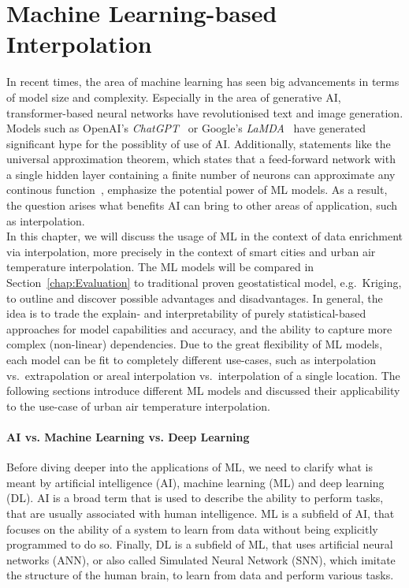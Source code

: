 \chapter{Machine Learning-based Interpolation}
\label{chap:Machine Learning based Interpolation}

In recent times, the area of machine learning has seen big advancements in terms of model size and complexity. Especially in the area of generative AI, transformer-based neural networks have revolutionised text and image generation. Models such as OpenAI's \textit{ChatGPT}~\cite{openai2023gpt4} or Google's \textit{LaMDA}~\cite{thoppilan2022lamda} have generated significant hype for the possiblity of use of AI\@. Additionally, statements like the universal approximation theorem, which states that a feed-forward network with a single hidden layer containing a finite number of neurons can approximate any continous function~\cite{hornik1989multilayer}, emphasize the potential power of ML models. As a result, the question arises what benefits AI can bring to other areas of application, such as interpolation.\\
In this chapter, we will discuss the usage of ML in the context of data enrichment via interpolation, more precisely in the context of smart cities and urban air temperature interpolation. The ML models will be compared in Section~\ref{chap:Evaluation} to traditional proven geostatistical model, e.g.\ Kriging, to outline and discover possible advantages and disadvantages. In general, the idea is to trade the explain- and interpretability of purely statistical-based approaches for model capabilities and accuracy, and the ability to capture more complex (non-linear) dependencies.
Due to the great flexibility of ML models, each model can be fit to completely different use-cases, such as interpolation vs.\ extrapolation or areal interpolation vs.\ interpolation of a single location. The following sections introduce different ML models and discussed their applicability to the use-case of urban air temperature interpolation.

\subsubsection{AI vs. Machine Learning vs. Deep Learning}

Before diving deeper into the applications of ML, we need to clarify what is meant by artificial intelligence (AI), machine learning (ML) and deep learning (DL). AI is a broad term that is used to describe the ability to perform tasks, that are usually associated with human intelligence. ML is a subfield of AI, that focuses on the ability of a system to learn from data without being explicitly programmed to do so. Finally, DL is a subfield of ML, that uses artificial neural networks (ANN), or also called Simulated Neural Network (SNN), which imitate the structure of the human brain, to learn from data and perform various tasks.

